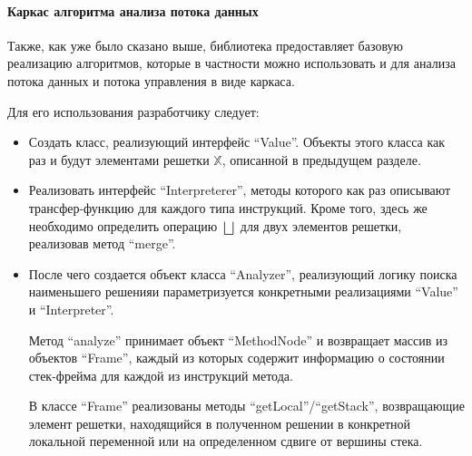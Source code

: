 \paragraph{Каркас алгоритма анализа потока данных}
Также, как уже было сказано выше, библиотека предоставляет базовую реализацию алгоритмов, которые
в частности можно использовать и для анализа потока данных и потока управления в виде каркаса.

Для его использования разработчику следует:
\begin{itemize}
    \item Создать класс, реализующий интерфейс ``Value''. Объекты этого класса как раз и будут
    элементами решетки $\mathbb{X}$, описанной в предыдущем разделе.

    \item Реализовать интерфейс ``Interpreterer'', методы которого как раз описывают трансфер-функцию
    для каждого типа инструкций.
    Кроме того, здесь же необходимо определить операцию $\bigsqcup$ для двух элементов
    решетки, реализовав метод ``merge''.

    \item После чего создается объект класса ``Analyzer'', реализующий логику поиска наименьшего
    решенияи параметризуется конкретными реализациями ``Value'' и ``Interpreter''.

    Метод ``analyze'' принимает объект ``MethodNode'' и возвращает массив из объектов ``Frame'',
    каждый из которых содержит информацию о состоянии стек-фрейма для каждой из инструкций метода.

    В классе ``Frame'' реализованы методы ``getLocal''/``getStack'', возвращающие элемент решетки,
    находящийся в полученном решении в конкретной локальной переменной или на определенном сдвиге
    от вершины стека.
\end{itemize}

